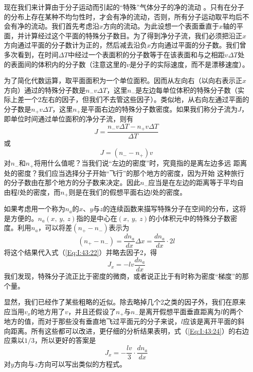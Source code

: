 现在我们来计算由于分子运动而引起的“特殊”气体分子的净的流动 。只有在分子的分布上存在某种不均匀性时，才会有净的流动，否则，所有分子运动取平均后不会有净的流动。我们首先考虑沿$x$方向的流动。为此设想一个表面垂直于$x$轴的平面，并计算经过这个平面的特殊分子数目。为了得到净分子流，我们必须把沿正$x$方向通过平面的分子数计为正的，然后减去沿负$x$方向通过平面的分子数。我们曾多次看到，在时间$\Delta T$中经过一个表面积的分子数等于在该表面和与之相距$v \Delta T$处的表面间的体积内的分子数（注意这里的$v$是分子的实际速度，而不是漂移速度）。

为了简化代数运算，取平面面积为一个单位面积。因而从左向右（以向右表示正$x$方向）通过的特殊分子数是$n_-v \Delta T$，这里$n_-$是左边每单位体积的特殊分子数（实际上差一个2左右的因子，但我们不去管这些因子）。类似地，从右向左通过平面的分子数是$n_+ v \Delta T$，这里$n_+$是平面右边的特殊分子数密度。如果我们称分子流为$J$，即单位时间通过单位面积的净分子流，则有
\begin{equation}
    \label{Eq:I:43:21}
    J=\frac{n_-v \Delta T - n_+ v \Delta T}{\Delta T}
\end{equation}
或
\begin{equation}
    \label{Eq:I:43:22}
    J=(n_- - n_+)v
\end{equation}
对$n_-$和$n_+$将用什么值呢？当我们说“左边的密度”时，究竟指的是离左边多远 距离处的密度？我们应当选择分子开始“飞行”的那个地方的密度，因为开始 这种旅行的分子数由在那个地方的分子数来决定。因此$n_-$应当是在左边的距离等于平均自由程$l$处的密度，而$n_+$则是在我们的假想平面右边$l$处的密度。

如果考虑用一个称为$n_a$的$x$、$y$与$z$的连续函数来描写特殊分子在空间的分布，这将是方便的。$n_a(x,~y,~z)$指的是中心在$(x,~y,~z)$的小体积元中的特殊分子数密度。利用$n_a$，可以将差$(n_+ -n_-)$表示为
\begin{equation}
    \label{Eq:I:43:23}
    (n_+ -n_-) = \frac{dn_a}{dx} \Delta x = \frac{dn_a}{dx} \cdot 2l
\end{equation}
将这个结果代入式（\ref{Eq:I:43:22}）并略去因子2，得
\begin{equation}
    \label{Eq:I:43:24}
    J_x = -lv\frac{dn_a}{dx}
\end{equation}
我们发现，特殊分子流正比于密度的微商，或者说正比于有时称为密度“梯度”的那个量。

显然，我们已经作了某些粗略的近似。除去略掉几个2之类的因子外，我们在原来应当用$v_x$的地方用了$v$，并且还假设了$n_+$与$n_-$是离开假想平面垂直距离为$l$的两个地方的值，而对于那些没有垂直地飞过平面元的分子来说，$l$应该是离开平面的斜向距离。所有这些都可以改进，更仔细的分析结果表明，式（\ref{Eq:I:43:24}）的右边应乘以$1/3$，所以更好的答案是
\begin{equation}
    \label{Eq:I:43:25}
    J_x = -\frac{lv}{3}\cdot\frac{dn_a}{dx}
\end{equation}
对$y$方向与$z$方向可以写出类似的方程式。

